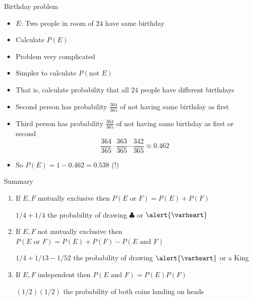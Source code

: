 \documentclass[handout]{beamer}
\theoremstyle{definition}
\begin{document}
\begin{frame}{Birthday problem}
\begin{itemize}
\item $E$: Two people in room of $24$ have same birthday
\item Calculate $P\left(E\right)$
\item Problem very complicated
\item Simpler to calculate $P\left(\text{not $E$}\right)$
\item That is, calculate probability that all $24$ people
have different birthdays
\item Second person has probability $\frac{364}{365}$ of
not having same birthday as first
\item Third person has probability $\frac{363}{365}$ of
not having same birthday as first or second
\[\frac{364}{365}
\cdot\frac{363}{365}
\cdots\frac{342}{365}\approx 0.462\]
\item So $P\left(E\right)=1-0.462=0.538$ (\alert{!})
\end{itemize}
\end{frame}

\begin{frame}{Summary}
\begin{enumerate}
\item If $E,F$ mutually exclusive then
$P\left(\text{$E$ or $F$}\right)=P\left(E\right)+P\left(F\right)$
\begin{example} $1/4+1/4$ the probability
of drawing $\clubsuit$ or $\alert{\varheart}$ \end{example}
\item If $E,F$ \alert{not} mutually exclusive then
$P\left(\text{$E$ or $F$}\right)=P\left(E\right)+P\left(F\right)
-P\left(\text{$E$ and $F$}\right)$
\begin{example} $1/4+1/13-1/52$ the probability
of drawing $\alert{\varheart}$ or a King\end{example}
\item If $E,F$ independent then
$P\left(\text{$E$ and $F$}\right)=P\left(E\right)P\left(F\right)$
\begin{example} $\left(1/2\right)\left(1/2\right)$ the probability
of both coins landing on heads\end{example}
\end{enumerate}
\end{frame}

\end{document}
